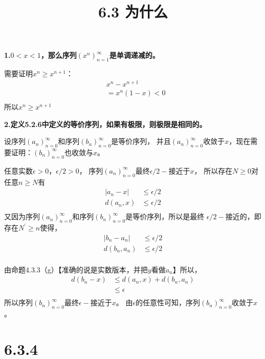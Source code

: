 \documentclass{article}
\theoremstyle{mystyle}
\begin{document}
\title{6.3 为什么}
\maketitle

\textbf{1.$0<x<1$，那么序列$(x^n)_{n=1}^\infty$是单调递减的。}

需要证明$x^n \geq x^{n+1}$：
\begin{align*}
   & x^n - x^{n+1}      \\
   & = x^n(1-x)     < 0 \\
\end{align*}
所以$x^n \geq x^{n+1}$

\textbf{2.定义5.2.6中定义的等价序列，如果有极限，则极限是相同的。}

设序列$(a_n)_{n=0}^\infty$和序列$(b_n)_{n=0}^\infty$是等价序列，
并且$(a_n)_{n=0}^\infty$收敛于$x$，现在需要证明：$(b_n)_{n=0}^\infty$也收敛与$x$。

任意实数$\epsilon > 0$，$\epsilon/2 > 0$，
序列$(a_n)_{n=0}^\infty$最终$\epsilon/2 -$接近于$x$，
所以存在$N \geq 0$对任意$n \geq N$有
\begin{align*}
  |a_n - x| & \leq \epsilon / 2 \\
  d(a_n, x) & \leq \epsilon / 2 \\
\end{align*}
又因为序列$(a_n)_{n=0}^\infty$和序列$(b_n)_{n=0}^\infty$是等价序列，所以是最终
$\epsilon/2 -$接近的，即存在$N^\prime \geq n$使得，
\begin{align*}
  |b_n - a_n| & \leq \epsilon/2 \\
  d(b_n, a_n) & \leq \epsilon/2 \\
\end{align*}

由命题4.3.3（g）【准确的说是实数版本，并把$y$看做$a_n$】所以，
\begin{align*}
  d(b_n - x) & \leq d(a_n, x) + d(b_n, a_n) \\
             & \leq \epsilon                \\
\end{align*}
所以序列$(b_n)_{n=0}^\infty$最终$\epsilon -$接近于$x$。
由$\epsilon$的任意性可知，序列$(b_n)_{n=0}^\infty$收敛于$x$。

\section*{6.3.4}
\end{document}
